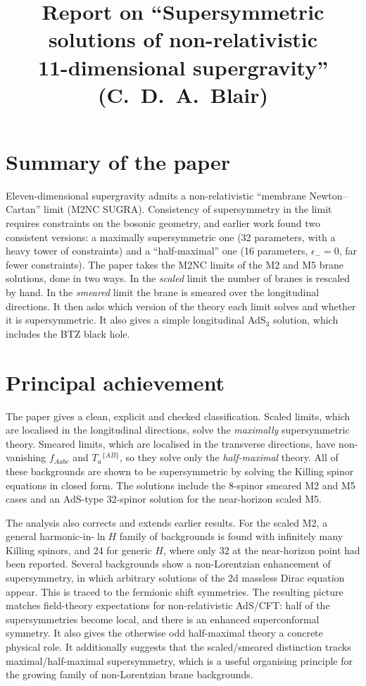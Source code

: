 \documentclass[11pt]{article}
\title{Report on ``Supersymmetric solutions of non-relativistic\\ 11-dimensional supergravity'' (C.~D.~A.~Blair)}
\date{}
\newcommand{\MNC}{M2NC}
\begin{document}
\maketitle

\section*{Summary of the paper}
Eleven-dimensional supergravity admits a non-relativistic ``membrane Newton--Cartan'' limit (\MNC{} SUGRA).
Consistency of supersymmetry in the limit requires constraints on the bosonic geometry, and earlier work found two consistent versions: a maximally supersymmetric one (32 parameters, with a heavy tower of constraints) and a ``half-maximal'' one (16 parameters, $\epsilon_-=0$, far fewer constraints).
The paper takes the \MNC{} limits of the M2 and M5 brane solutions, done in two ways.
In the \emph{scaled} limit the number of branes is rescaled by hand.
In the \emph{smeared} limit the brane is smeared over the longitudinal directions.
It then asks which version of the theory each limit solves and whether it is supersymmetric.
It also gives a simple longitudinal AdS$_3$ solution, which includes the BTZ black hole.

\section{Principal achievement}
The paper gives a clean, explicit and checked classification.
Scaled limits, which are localised in the longitudinal directions, solve the \emph{maximally} supersymmetric theory.
Smeared limits, which are localised in the transverse directions, have non-vanishing $f_{Aabc}$ and $T_a{}^{\{AB\}}$, so they solve only the \emph{half-maximal} theory.
All of these backgrounds are shown to be supersymmetric by solving the Killing spinor equations in closed form.
The solutions include the 8-spinor smeared M2 and M5 cases and an AdS-type 32-spinor solution for the near-horizon scaled M5.

The analysis also corrects and extends earlier results.
For the scaled M2, a general harmonic-in-$\ln H$ family of backgrounds is found with infinitely many Killing spinors, and 24 for generic $H$, where only 32 at the near-horizon point had been reported.
Several backgrounds show a non-Lorentzian enhancement of supersymmetry, in which arbitrary solutions of the 2d massless Dirac equation appear.
This is traced to the fermionic shift symmetries.
The resulting picture matches field-theory expectations for non-relativistic AdS/CFT: half of the supersymmetries become local, and there is an enhanced superconformal symmetry.
It also gives the otherwise odd half-maximal theory a concrete physical role.
It additionally suggests that the scaled/smeared distinction tracks maximal/half-maximal supersymmetry, which is a useful organising principle for the growing family of non-Lorentzian brane backgrounds.
\end{document}

